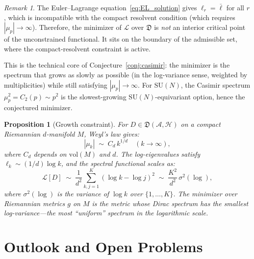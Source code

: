 \documentclass[12pt]{article}
\newtheorem{proposition}[theorem]{Proposition}
\theoremstyle{definition}
\theoremstyle{remark}
\newtheorem{remark}[theorem]{Remark}
\newcommand{\SU}{\mathrm{SU}}
\begin{document}
\begin{remark}
The Euler--Lagrange equation~\eqref{eq:EL_solution} gives
$\ell_r = \bar\ell$ for all $r$, which is
incompatible with the compact resolvent condition (which requires
$|\mu_p| \to \infty$).  Therefore, the minimizer of $\mathcal{L}$
over $\mathfrak{D}$ is \emph{not} an interior critical point of the
unconstrained functional.  It sits on the boundary of the admissible
set, where the compact-resolvent constraint is active.

This is the technical core of Conjecture~\ref{conj:casimir}:
the minimizer is the spectrum that grows as slowly as possible
(in the log-variance sense, weighted by multiplicities) while
still satisfying $|\mu_p| \to \infty$.  For $\SU(N)$, the Casimir
spectrum $\mu_p^2 = C_2(p) \sim p^2$ is the slowest-growing
$\SU(N)$-equivariant option, hence the conjectured minimizer.
\end{remark}

\begin{proposition}[Growth constraint]\label{prop:growth}
For $D \in \mathfrak{D}(\mathcal{A},\mathcal{H})$ on a compact
Riemannian $d$-manifold $M$, Weyl's law gives:
\begin{equation}\label{eq:weyl}
  |\mu_k| \;\sim\; C_d\,k^{1/d}
  \quad (k \to \infty),
\end{equation}
where $C_d$ depends on $\mathrm{vol}(M)$ and $d$.
The log-eigenvalues satisfy $\ell_k \sim (1/d)\log k$, and
the spectral functional scales as:
\begin{equation}\label{eq:L_scaling}
  \mathcal{L}[D] \;\sim\;
  \frac{1}{d^2}\sum_{k,j=1}^K (\log k - \log j)^2
  \;\sim\; \frac{K^2}{d^2}\,\sigma^2(\log),
\end{equation}
where $\sigma^2(\log)$ is the variance of $\log k$ over $\{1,\ldots,K\}$.
The minimizer over Riemannian metrics $g$ on $M$ is the metric
whose Dirac spectrum has the smallest log-variance---the most
``uniform'' spectrum in the logarithmic scale.
\end{proposition}

\section{Outlook and Open Problems}
\label{sec:outlook}
\end{document}
